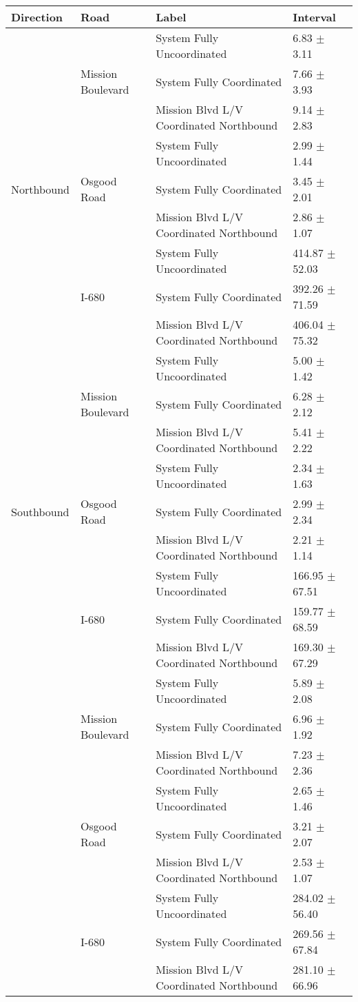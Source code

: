 \begin{tabular}{llll}
\toprule
Direction & Road & Label & Interval \\
\midrule
\multirow[t]{9}{*}{Northbound} & \multirow[t]{3}{*}{Mission Boulevard} & System Fully Uncoordinated & 6.83 $\pm$ 3.11 \\
 &  & System Fully Coordinated & 7.66 $\pm$ 3.93 \\
 &  & Mission Blvd L/V Coordinated Northbound & 9.14 $\pm$ 2.83 \\
 & \multirow[t]{3}{*}{Osgood Road} & System Fully Uncoordinated & 2.99 $\pm$ 1.44 \\
 &  & System Fully Coordinated & 3.45 $\pm$ 2.01 \\
 &  & Mission Blvd L/V Coordinated Northbound & 2.86 $\pm$ 1.07 \\
 & \multirow[t]{3}{*}{I-680} & System Fully Uncoordinated & 414.87 $\pm$ 52.03 \\
 &  & System Fully Coordinated & 392.26 $\pm$ 71.59 \\
 &  & Mission Blvd L/V Coordinated Northbound & 406.04 $\pm$ 75.32 \\
\multirow[t]{9}{*}{Southbound} & \multirow[t]{3}{*}{Mission Boulevard} & System Fully Uncoordinated & 5.00 $\pm$ 1.42 \\
 &  & System Fully Coordinated & 6.28 $\pm$ 2.12 \\
 &  & Mission Blvd L/V Coordinated Northbound & 5.41 $\pm$ 2.22 \\
 & \multirow[t]{3}{*}{Osgood Road} & System Fully Uncoordinated & 2.34 $\pm$ 1.63 \\
 &  & System Fully Coordinated & 2.99 $\pm$ 2.34 \\
 &  & Mission Blvd L/V Coordinated Northbound & 2.21 $\pm$ 1.14 \\
 & \multirow[t]{3}{*}{I-680} & System Fully Uncoordinated & 166.95 $\pm$ 67.51 \\
 &  & System Fully Coordinated & 159.77 $\pm$ 68.59 \\
 &  & Mission Blvd L/V Coordinated Northbound & 169.30 $\pm$ 67.29 \\
\multirow[t]{9}{*}{} & \multirow[t]{3}{*}{Mission Boulevard} & System Fully Uncoordinated & 5.89 $\pm$ 2.08 \\
 &  & System Fully Coordinated & 6.96 $\pm$ 1.92 \\
 &  & Mission Blvd L/V Coordinated Northbound & 7.23 $\pm$ 2.36 \\
 & \multirow[t]{3}{*}{Osgood Road} & System Fully Uncoordinated & 2.65 $\pm$ 1.46 \\
 &  & System Fully Coordinated & 3.21 $\pm$ 2.07 \\
 &  & Mission Blvd L/V Coordinated Northbound & 2.53 $\pm$ 1.07 \\
 & \multirow[t]{3}{*}{I-680} & System Fully Uncoordinated & 284.02 $\pm$ 56.40 \\
 &  & System Fully Coordinated & 269.56 $\pm$ 67.84 \\
 &  & Mission Blvd L/V Coordinated Northbound & 281.10 $\pm$ 66.96 \\
\bottomrule
\end{tabular}
